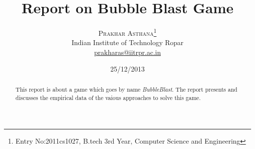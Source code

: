 \documentclass[twoside]{article}
\title{\vspace{-15mm}\fontsize{24pt}{10pt}\selectfont\textbf{Report on Bubble Blast Game}} %
\author{
\large
\textsc{Prakhar Asthana}\thanks{Entry No:2011cs1027, B.tech 3rd Year, Computer Science and Engineering}\\[2mm] %
\normalsize Indian Institute of Technology Ropar \\ %
\normalsize \href{mailto:prakharas@iitrpr.ac.in}{prakharas@iitrpr.ac.in} %
\date{25/12/2013}
}
\begin{document}
\maketitle %

\thispagestyle{fancy} %


\begin{abstract}

\noindent This report is about a game which goes by name \textit{BubbleBlast}. The report presents and discusses the empirical data of the vaious approaches to solve this game.  %

\end{abstract}

\end{document}
